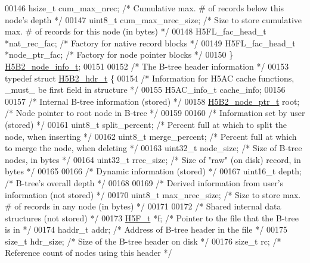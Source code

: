 \begin{DoxyCode}
{{00146     hsize\_t     cum\_max\_nrec;   \textcolor{comment}{/* Cumulative max. # of records below this node's depth */}
00147     uint8\_t     cum\_max\_nrec\_size; \textcolor{comment}{/* Size to store cumulative max. # of records for this node (in bytes) 
      */}
00148     H5FL\_fac\_head\_t *nat\_rec\_fac;   \textcolor{comment}{/* Factory for native record blocks */}
00149     H5FL\_fac\_head\_t *node\_ptr\_fac;  \textcolor{comment}{/* Factory for node pointer blocks */}
00150 \} \hyperlink{struct_h5_b2__node__info__t}{H5B2\_node\_info\_t};
00151 
00152 \textcolor{comment}{/* The B-tree header information */}
00153 \textcolor{keyword}{typedef} \textcolor{keyword}{struct }\hyperlink{struct_h5_b2__hdr__t}{H5B2\_hdr\_t} \{
00154     \textcolor{comment}{/* Information for H5AC cache functions, \_must\_ be first field in structure */}
00155     H5AC\_info\_t cache\_info;
00156 
00157     \textcolor{comment}{/* Internal B-tree information (stored) */}
00158     \hyperlink{struct_h5_b2__node__ptr__t}{H5B2\_node\_ptr\_t} root;       \textcolor{comment}{/* Node pointer to root node in B-tree        */}
00159 
00160     \textcolor{comment}{/* Information set by user (stored) */}
00161     uint8\_t     split\_percent;  \textcolor{comment}{/* Percent full at which to split the node, when inserting */}
00162     uint8\_t     merge\_percent;  \textcolor{comment}{/* Percent full at which to merge the node, when deleting */}
00163     uint32\_t    node\_size;      \textcolor{comment}{/* Size of B-tree nodes, in bytes             */}
00164     uint32\_t    rrec\_size;      \textcolor{comment}{/* Size of "raw" (on disk) record, in bytes   */}
00165 
00166     \textcolor{comment}{/* Dynamic information (stored) */}
00167     uint16\_t    depth;      \textcolor{comment}{/* B-tree's overall depth                     */}
00168 
00169     \textcolor{comment}{/* Derived information from user's information (not stored) */}
00170     uint8\_t     max\_nrec\_size;  \textcolor{comment}{/* Size to store max. # of records in any node (in bytes) */}
00171 
00172     \textcolor{comment}{/* Shared internal data structures (not stored) */}
00173     \hyperlink{struct_h5_f__t}{H5F\_t}       *f;             \textcolor{comment}{/* Pointer to the file that the B-tree is in */}
00174     haddr\_t     addr;           \textcolor{comment}{/* Address of B-tree header in the file */}
00175     \textcolor{keywordtype}{size\_t}      hdr\_size;       \textcolor{comment}{/* Size of the B-tree header on disk */}
00176     \textcolor{keywordtype}{size\_t}      rc;             \textcolor{comment}{/* Reference count of nodes using this header */}
}}
\end{DoxyCode}
